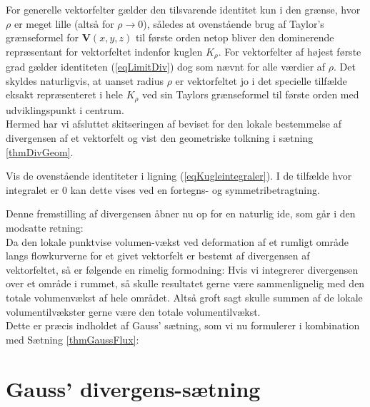 \begin{bevis}
For generelle vektorfelter gælder den tilsvarende
identitet kun i den grænse, hvor $\rho$ er meget
lille (altså for $\rho \to 0$), således at
ovenstående brug af Taylor's grænseformel for $\mathbf{V}(x,y,z)$ til
første orden netop bliver den dominerende
repræsentant for vektorfeltet indenfor kuglen
$K_{\rho}$. For vektorfelter af højest første
grad gælder identiteten (\ref{eqLimitDiv}) dog
som nævnt for alle værdier af $\rho$. Det skyldes
naturligvis, at uanset radius $\rho$ er
vektorfeltet jo i det specielle tilfælde eksakt
repræsenteret i hele $K_{\rho}$ ved sin
Taylors grænseformel til første orden med
udviklingspunkt i centrum.\\

Hermed har vi afsluttet skitseringen af beviset
for den lokale bestemmelse af divergensen af et
vektorfelt og vist den geometriske tolkning i
sætning \ref{thmDivGeom}.
\end{bevis}




\begin{exercise}
Vis de ovenstående identiteter i ligning
(\ref{eqKugleintegraler}). I de tilfælde hvor
integralet er $0$ kan dette vises ved en
fortegns- og symmetribetragtning.
\end{exercise}




Denne fremstilling af divergensen åbner nu op for
en naturlig ide, som går i den modsatte retning:\\

Da den lokale punktvise volumen-vækst ved
deformation af et rumligt område langs
flowkurverne for et givet vektorfelt er bestemt
af divergensen af vektorfeltet, så er følgende en
rimelig formodning: Hvis vi integrerer
divergensen over et område i rummet, så skulle
resultatet gerne være sammenlignelig med den
totale volumenvækst af hele området. Altså groft
sagt skulle summen af de lokale volumentilvækster
gerne være den totale volumentilvækst. \\

 Dette er
præcis indholdet af Gauss' sætning, som vi nu
formulerer i kombination med Sætning
\ref{thmGaussFlux}:




\section{Gauss' divergens-sætning} \label{secGauss}



